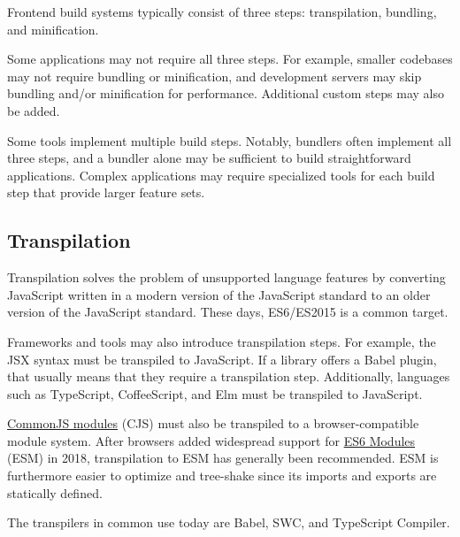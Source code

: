 \documentclass{article}
\begin{document}
Frontend build systems typically consist of three steps: transpilation, bundling, and minification.

Some applications may not require all three steps. For example, smaller codebases may not require
bundling or minification, and development servers may skip bundling and/or minification for
performance. Additional custom steps may also be added.

Some tools implement multiple build steps. Notably, bundlers often implement all three steps, and a
bundler alone may be sufficient to build straightforward applications. Complex applications may
require specialized tools for each build step that provide larger feature sets.

\subsection{Transpilation}

Transpilation solves the problem of unsupported language features by converting JavaScript written
in a modern version of the JavaScript standard to an older version of the JavaScript standard. These
days, ES6/ES2015 is a common target.

Frameworks and tools may also introduce transpilation steps. For example, the JSX syntax must be
transpiled to JavaScript. If a library offers a Babel plugin, that usually means that they require a
transpilation step. Additionally, languages such as TypeScript, CoffeeScript, and Elm must be
transpiled to JavaScript.

\href{https://wiki.commonjs.org/wiki/Modules}{CommonJS modules} (CJS) must also be transpiled to a
browser-compatible module system. After browsers added widespread support for
\href{https://exploringjs.com/es6/ch_modules.html}{ES6 Modules} (ESM) in 2018, transpilation to ESM
has generally been recommended. ESM is furthermore easier to optimize and tree-shake since its
imports and exports are statically defined.

The transpilers in common use today are Babel, SWC, and TypeScript Compiler.
\end{document}
